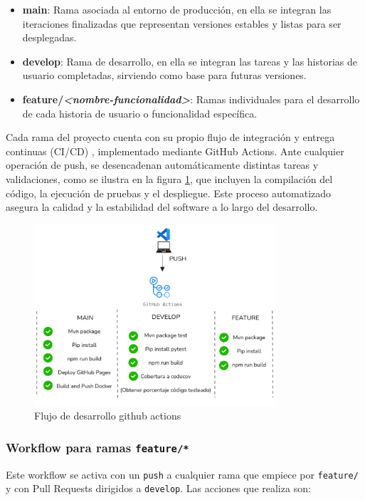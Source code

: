 \begin{itemize}
    \item \textbf{main}: Rama asociada al entorno de producción, en ella se integran las iteraciones finalizadas que representan versiones estables y listas para ser desplegadas.
    \item \textbf{develop}: Rama de desarrollo, en ella se integran las tareas y las historias de usuario completadas, sirviendo como base para futuras versiones.
    \item \textbf{feature/\textit{<nombre-funcionalidad>}}: Ramas individuales para el desarrollo de cada historia de usuario o funcionalidad específica.
\end{itemize}
\vspace{0.5em}
Cada rama del proyecto cuenta con su propio flujo de integración y entrega continuas (CI/CD) \cite{cicd}, implementado mediante GitHub Actions. Ante cualquier operación de push, se desencadenan automáticamente distintas tareas y validaciones, como se ilustra en la figura \ref{fig:gitactions}, que incluyen la compilación del código, la ejecución de pruebas y el despliegue. Este proceso automatizado asegura la calidad y la estabilidad del software a lo largo del desarrollo.
\begin{figure}[H]
  \centering
  \includegraphics[width=0.8\textwidth]{fotos/githubActions.png}
  \caption{Flujo de desarrollo github actions}
  \label{fig:gitactions}
\end{figure}

\subsubsection*{Workflow para ramas \texttt{feature/*}}

Este workflow se activa con un \texttt{push} a cualquier rama que empiece por \texttt{feature/} y con Pull Requests dirigidos a \texttt{develop}. Las acciones que realiza son: 

